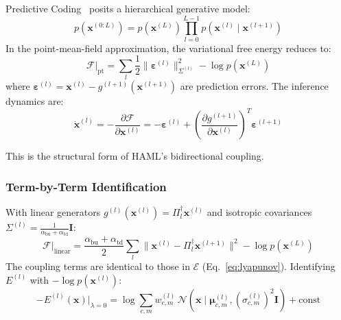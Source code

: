 \documentclass[11pt,a4paper]{article}
\begin{document}
Predictive Coding~\cite{rao1999predictive,friston2005theory} posits a hierarchical
generative model:
\begin{equation}
  p(\mathbf{x}^{(0:L)}) = p(\mathbf{x}^{(L)}) \prod_{l=0}^{L-1}
    p(\mathbf{x}^{(l)} \mid \mathbf{x}^{(l+1)})
\end{equation}
In the point-mean-field approximation, the variational free energy reduces to:
\begin{equation}
  \mathcal{F}\big|_{\mathrm{pt}} =
    \sum_l \frac{1}{2}\|\boldsymbol{\varepsilon}^{(l)}\|^2_{\Sigma^{(l)}}
    - \log p(\mathbf{x}^{(L)})
\end{equation}
where $\boldsymbol{\varepsilon}^{(l)} = \mathbf{x}^{(l)} - g^{(l+1)}(\mathbf{x}^{(l+1)})$
are prediction errors. The inference dynamics are:
\begin{equation}
  \dot{\mathbf{x}}^{(l)} = -\frac{\partial \mathcal{F}}{\partial \mathbf{x}^{(l)}}
    = -\boldsymbol{\varepsilon}^{(l)}
    + \left(\frac{\partial g^{(l+1)}}{\partial \mathbf{x}^{(l)}}\right)^T
      \boldsymbol{\varepsilon}^{(l+1)}
\end{equation}

This is the structural form of HAML's bidirectional coupling.

\subsubsection{Term-by-Term Identification}

With linear generators $g^{(l)}(\mathbf{x}^{(l)}) = \Pi_l^\dagger \mathbf{x}^{(l)}$ and
isotropic covariances $\Sigma^{(l)} = \frac{1}{\alpha_{\mathrm{bu}}+\alpha_{\mathrm{td}}}\mathbf{I}$:
\begin{equation}
  \mathcal{F}\big|_{\mathrm{linear}} =
    \frac{\alpha_{\mathrm{bu}}+\alpha_{\mathrm{td}}}{2}
    \sum_l \|\mathbf{x}^{(l)} - \Pi_l^\dagger \mathbf{x}^{(l+1)}\|^2
    - \log p(\mathbf{x}^{(L)})
\end{equation}
The coupling terms are identical to those in $\mathcal{E}$ (Eq.~\ref{eq:lyapunov}).
Identifying $E^{(l)}$ with $-\log p(\mathbf{x}^{(l)})$:
\begin{equation}
  -E^{(l)}(\mathbf{x})\big|_{\lambda=0} =
    \log \sum_{c,m} w^{(l)}_{c,m}\,
    \mathcal{N}(\mathbf{x} \mid \boldsymbol{\mu}^{(l)}_{c,m}, (\sigma^{(l)}_{c,m})^2\mathbf{I})
    + \text{const}
\end{equation}
\end{document}
